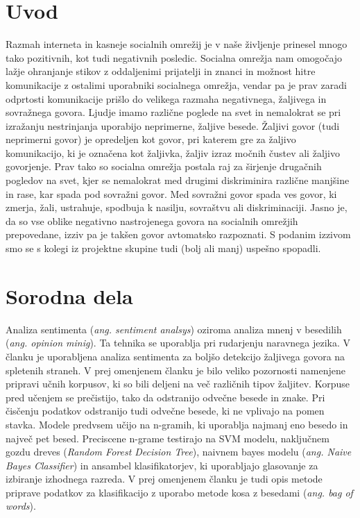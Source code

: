 \documentclass{acm_proc_article-sp}
\begin{document}

\section{Uvod}
Razmah interneta in kasneje socialnih omrežij je v naše življenje prinesel mnogo tako pozitivnih, kot tudi negativnih posledic. 
Socialna omrežja nam omogočajo lažje ohranjanje stikov z oddaljenimi prijatelji in znanci in možnost hitre komunikacije z ostalimi uporabniki socialnega omrežja, vendar pa je prav zaradi odprtosti komunikacije prišlo do velikega razmaha negativnega, žaljivega in sovražnega govora.
Ljudje imamo različne poglede na svet in nemalokrat se pri izražanju nestrinjanja uporabijo neprimerne, žaljive besede. Žaljivi govor (tudi neprimerni govor) je opredeljen kot govor, pri katerem gre za žaljivo komunikacijo, ki je označena kot žaljivka, žaljiv izraz močnih čustev ali žaljivo govorjenje.
Prav tako so socialna omrežja postala raj za širjenje drugačnih pogledov na svet, kjer se nemalokrat med drugimi diskriminira različne manjšine in rase, kar spada pod sovražni govor.
Med sovražni govor spada ves govor, ki zmerja, žali, ustrahuje, spodbuja k nasilju, sovraštvu ali diskriminaciji. Jasno je, da so vse oblike negativno nastrojenega govora na socialnih omrežjih prepovedane, izziv pa je takšen govor avtomatsko razpoznati.
S podanim izzivom smo se s kolegi iz projektne skupine tudi (bolj ali manj) uspešno spopadli.

\section{Sorodna dela}
Analiza sentimenta ({\it ang. sentiment analsys}) oziroma analiza mnenj v besedilih ({\it ang. opinion minig}).
Ta tehnika se uporablja pri rudarjenju naravnega jezika.
V članku \cite{POI3:POI385} je uporabljena analiza sentimenta za boljšo detekcijo žaljivega govora na spletenih straneh.
V prej omenjenem članku je bilo veliko pozornosti namenjene pripravi učnih korpusov, ki so bili deljeni na več različnih tipov žaljitev.
Korpuse pred učenjem se prečistijo, tako da odstranijo odvečne besede in znake.
Pri čisčenju podatkov odstranijo tudi odvečne besede, ki ne vplivajo na pomen stavka.
Modele predvsem učijo na n-gramih, ki uporablja najmanj eno besedo in največ pet besed.
Preciscene n-grame testirajo na SVM modelu, naključnem gozdu dreves ({\it Random Forest Decision Tree}), naivnem bayes modelu ({\it ang. Naive Bayes Classifier}) in ansambel klasifikatorjev, ki uporabljajo glasovanje za izbiranje izhodnega razreda.
V prej omenjenem članku je tudi opis metode priprave podatkov za klasifikacijo z uporabo metode kosa z besedami ({\it ang. bag of words}).
\end{document}
